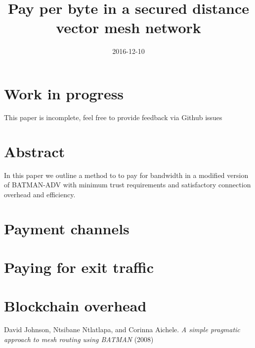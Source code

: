 \documentclass[11pt]{article}
\title{\textbf{Pay per byte in a secured distance vector mesh network}}
\date{2016-12-10}
\begin{document}
\maketitle

\section{Work in progress}

This paper is incomplete, feel free to provide feedback via Github issues

\tableofcontents

\section{Abstract}

In this paper we outline a method to to pay for bandwidth in a modified version of BATMAN-ADV \cite{batman} with minimum trust requirements and satisfactory connection overhead and efficiency. 

\section{Payment channels}

\section{Paying for exit traffic}



\section{Blockchain overhead}

\medskip


\begin{thebibliography}{1}

David Johnson, Ntsibane Ntlatlapa, and Corinna Aichele.
\textit{A simple pragmatic approach to mesh routing using BATMAN} (2008)

\end{thebibliography}
\end{document}
